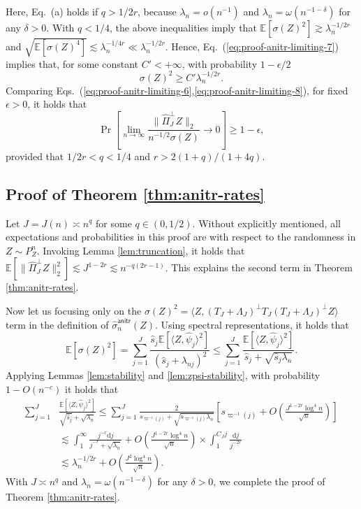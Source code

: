 \documentclass[11pt,a4paper]{article}
\renewcommand{\hat}{\widehat}
\theoremstyle{definition}
\theoremstyle{plain}
\theoremstyle{remark}
\newcommand{\ud}{\mathrm d}
\newcommand{\anitr}{\mathsf{anitr}}
\begin{document}
Here, Eq.~(a) holds if $q>1/2r$, because $\lambda_n =o(n^{-1})$ and $\lambda_n=\omega(n^{-1-\delta})$ for any $\delta>0$.
With $q<1/4$, the above inequalities imply that $\mathbb E[\sigma(Z)^2]\gtrsim \lambda_n^{-1/2r}$ and $\sqrt{\mathbb E[\sigma(Z)^4]}\lesssim \lambda_n^{-1/4r} \ll \lambda_n^{-1/2r}$.
Hence, Eq.~(\ref{eq:proof-anitr-limiting-7}) implies that, for some constant $C'<+\infty$, with probability $1-\epsilon/2$ 
\begin{equation}
\sigma(Z)^2 \geq C'\lambda_n^{-1/2r}.
\label{eq:proof-anitr-limiting-8}
\end{equation}
Comparing Eqs.~(\ref{eq:proof-anitr-limiting-6},\ref{eq:proof-anitr-limiting-8}), for fixed $\epsilon>0$, it holds that
$$
\Pr\left[\lim_{n\to\infty}\frac{\|\hat\Pi_J^\perp Z\|_2}{n^{-1/2}\sigma(Z)}\to 0\right] \geq 1-\epsilon,
$$
provided that $1/2r<q<1/4$ and $r>2(1+q)/(1+4q)$.


\subsection{Proof of Theorem \ref{thm:anitr-rates}}
Let $J=J(n)\asymp n^q$ for some $q\in(0,1/2)$.
Without explicitly mentioned, all expectations and probabilities in this proof are with respect to the randomness in $Z\sim P_Z^n$.
Invoking Lemma \ref{lem:truncation}, it holds that $\mathbb E[\|\hat\Pi_J^\perp Z\|_2^2]\lesssim J^{1-2r} \lesssim n^{-q(2r-1)}$. This explains the second term in Theorem \ref{thm:anitr-rates}.

Now let us focusing only on the $\sigma(Z)^2=\langle Z,(T_J+\Lambda_J)^\perp T_J (T_J+\Lambda_J)^\perp Z\rangle$ term in the definition of $\hat\sigma_n^\anitr(Z)$.
Using spectral representations, it holds that
\begin{equation}
\mathbb E[\sigma(Z)^2] = \sum_{j=1}^J \frac{\hat s_j \mathbb E[\langle Z,\hat\psi_j\rangle^2]}{(\hat s_j+\lambda_{nj})^2}\leq \sum_{j=1}^J\frac{\mathbb E[\langle Z,\hat\psi_j\rangle^2]}{{\hat s_j}+\sqrt{\hat s_j\lambda_n}}.
\label{eq:proof-anitr-rates-1}
\end{equation}
Applying Lemmas \ref{lem:stability} and \ref{lem:zpsi-stability}, with probability $1-O(n^{-c})$ it holds that
\begin{align}
\sum_{j=1}^J&\frac{\mathbb E[\langle Z,\hat\psi_j\rangle^2]}{\sqrt{\hat s_j}+\sqrt{\lambda_n}}
\leq \sum_{j=1}^J\frac{2}{{s_{\varpi^{-1}(j)}}+\sqrt{s_{\varpi^{-1}(j)}\lambda_n}}\left[s_{\varpi^{-1}(j)} + O\left(\frac{J^{1-2r}\log^4 n}{\sqrt{n}}\right)\right]\nonumber\\
&\lesssim \int_1^{\infty} \frac{j^{-r}\ud j}{j^{-r}+\sqrt{\lambda_n}} + O\left(\frac{J^{1-2r}\log^4 n}{\sqrt{n}}\right)\times \int_1^{C_J j}\frac{\ud j}{j^{-2r}}\nonumber\\
&\lesssim \lambda_n^{-1/2r} + O\left(\frac{J^2\log^4 n}{\sqrt{n}}\right).
\end{align}
With $J\asymp n^q$ and $\lambda_n=\omega(n^{-1-\delta})$ for any $\delta>0$, we complete the proof of Theorem \ref{thm:anitr-rates}.




\end{document}
